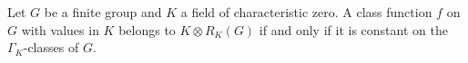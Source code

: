 Let $G$ be a finite group and $K$ a field of characteristic zero. A class function $f$ on $G$ with values in $K$ belongs to $K \otimes R_K(G)$ if and only if it is constant on the $\Gamma_K$-classes of $G$.
